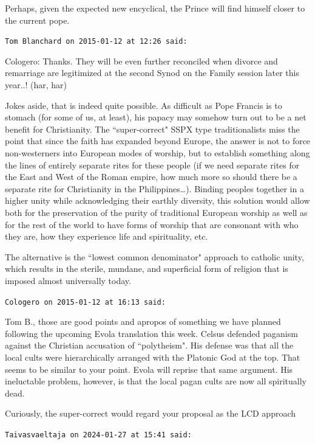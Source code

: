 \begin{footnotesize}
\begin{sffamily}
Perhaps, given the expected new encyclical, the Prince will find himself closer to the current pope.


\hfill

\texttt{Tom Blanchard on 2015-01-12 at 12:26 said: }

Cologero: Thanks. They will be even further reconciled when divorce and remarriage are legitimized at the second Synod on the Family session later this year..! (har, har)

Jokes aside, that is indeed quite possible. As difficult as Pope Francis is to stomach (for some of us, at least), his papacy may somehow turn out to be a net benefit for Christianity. The ``super-correct" SSPX type traditionalists miss the point that since the faith has expanded beyond Europe, the answer is not to force non-westerners into European modes of worship, but to establish something along the lines of entirely separate rites for these people (if we need separate rites for the East and West of the Roman empire, how much more so should there be a separate rite for Christianity in the Philippines…). Binding peoples together in a higher unity while acknowledging their earthly diversity, this solution would allow both for the preservation of the purity of traditional European worship as well as for the rest of the world to have forms of worship that are consonant with who they are, how they experience life and spirituality, etc. 

The alternative is the ``lowest common denominator" approach to catholic unity, which results in the sterile, mundane, and superficial form of religion that is imposed almost universally today.


\hfill

\texttt{Cologero on 2015-01-12 at 16:13 said: }

Tom B., those are good points and apropos of something we have planned following the upcoming Evola translation this week. Celsus defended paganism against the Christian accusation of ``polytheism". His defense was that all the local cults were hierarchically arranged with the Platonic God at the top. That seems to be similar to your point. Evola will reprise that same argument. His ineluctable problem, however, is that the local pagan cults are now all spiritually dead.

Curiously, the super-correct would regard your proposal as the LCD approach


\hfill

\texttt{Taivasvaeltaja on 2024-01-27 at 15:41 said: }


\end{sffamily}
\end{footnotesize}
